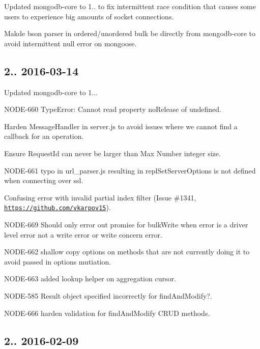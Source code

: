 \begin{DoxyItemize}
\item Updated mongodb-\/core to 1.. to fix intermittent race condition that causes some users to experience big amounts of socket connections.
\item Makde bson parser in ordered/unordered bulk be directly from mongodb-\/core to avoid intermittent null error on mongoose.
\end{DoxyItemize}

\subsection*{2.. 2016-\/03-\/14 }


\begin{DoxyItemize}
\item Updated mongodb-\/core to 1...
\item N\+O\+D\+E-\/660 Type\+Error\+: Cannot read property \textquotesingle{}no\+Release\textquotesingle{} of undefined.
\item Harden Message\+Handler in server.\+js to avoid issues where we cannot find a callback for an operation.
\item Ensure Request\+Id can never be larger than Max Number integer size.
\item N\+O\+D\+E-\/661 typo in url\+\_\+parser.\+js resulting in repl\+Set\+Server\+Options is not defined when connecting over ssl.
\item Confusing error with invalid partial index filter (Issue \#1341, \href{https://github.com/vkarpov15}{\tt https\+://github.\+com/vkarpov15}).
\item N\+O\+D\+E-\/669 Should only error out promise for bulk\+Write when error is a driver level error not a write error or write concern error.
\item N\+O\+D\+E-\/662 shallow copy options on methods that are not currently doing it to avoid passed in options mutiation.
\item N\+O\+D\+E-\/663 added lookup helper on aggregation cursor.
\item N\+O\+D\+E-\/585 Result object specified incorrectly for find\+And\+Modify?.
\item N\+O\+D\+E-\/666 harden validation for find\+And\+Modify C\+R\+UD methods.
\end{DoxyItemize}

\subsection*{2.. 2016-\/02-\/09 }


